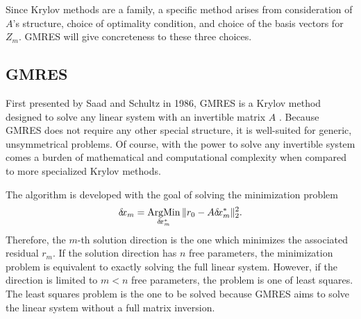 \documentclass[12pt]{UWMadThesis}
\begin{document}
Since Krylov methods are a family, a specific method arises from consideration of $A$'s structure, choice of optimality condition, and choice of the basis vectors for $Z_m$.
GMRES will give concreteness to these three choices.


\subsection{GMRES}
First presented by Saad and Schultz in 1986, GMRES is a Krylov method designed to solve any linear system with an invertible matrix $A$ \cite{saad_gmres_1986}.
Because GMRES does not require any other special structure, it is well-suited for generic, unsymmetrical problems.
Of course, with the power to solve any invertible system comes a burden of mathematical and computational complexity when compared to more specialized Krylov methods.

The algorithm is developed with the goal of solving the minimization problem
\begin{equation}
    \delta \mkern-3.00mu x_m = \operatorname*{ArgMin}_{\delta \mkern-3.00mu x_m^*} \|r_0 - A \delta \mkern-3.00mu x_m^*\|_2^2.
    \label{Eqn:GMRESMinimization}
\end{equation}
Therefore, the $m$-th solution direction is the one which minimizes the associated residual $r_m$.
If the solution direction has $n$ free parameters, the minimization problem is equivalent to exactly solving the full linear system.
However, if the direction is limited to $m < n$ free parameters, the problem is one of least squares.
The least squares problem is the one to be solved because GMRES aims to solve the linear system without a full matrix inversion.
\end{document}
